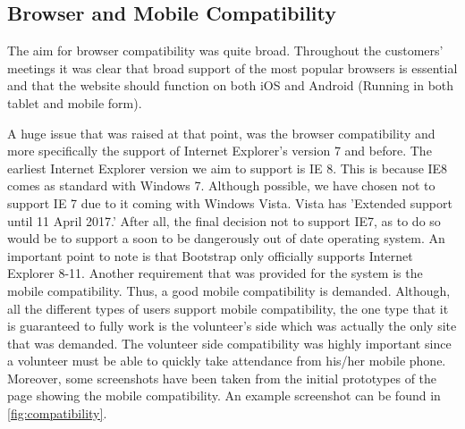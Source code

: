 \documentclass{l3proj}
\begin{document}
\subsection{Browser and Mobile Compatibility}
\label{sec:compatibility}

The aim for browser compatibility was quite broad. Throughout the customers' meetings it was clear that broad support of the most popular browsers is essential and that the website should function on both iOS and Android (Running in both tablet and mobile form).

A huge issue that was raised at that point, was the browser compatibility and more specifically the support of Internet Explorer’s version 7 and before. The earliest Internet Explorer version we aim to support is IE 8. This is because IE8 comes as standard with Windows 7. Although possible, we have chosen not to support IE 7 due to it coming with Windows Vista. Vista has 'Extended support until 11 April 2017.' After all, the final decision not to support IE7, as to do so would be to support a soon to be dangerously out of date operating system. An important point to note is that Bootstrap only officially supports Internet Explorer 8-11.
Another requirement that was provided for the system is the mobile compatibility. Thus, a good mobile compatibility is demanded. Although, all the different types of users support mobile compatibility, the one type that it is guaranteed to fully work is the volunteer's side which was actually the only site that was demanded. The volunteer side compatibility was highly important since a volunteer must be able to quickly take attendance from his/her mobile phone. Moreover, some screenshots have been taken from the initial prototypes of the page showing the mobile compatibility. An example screenshot can be found in \autoref{fig:compatibility}.
\end{document}
